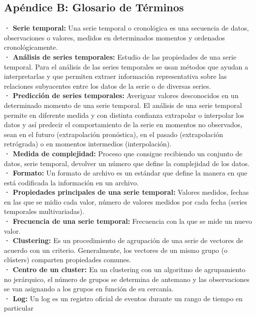\documentclass[14pt]{extarticle}
\theoremstyle{definition}
\theoremstyle{remark}
\begin{document}
\subsection{Apéndice B: Glosario de Términos}\label{sec:glosariodeterminos}
\textbf{· Serie temporal:} Una serie temporal o cronológica es una secuencia de datos, observaciones o valores, medidos en determinados momentos y ordenados cronológicamente.\\
\textbf{· Análisis de series temporales:} Estudio de las propiedades de una serie temporal. Para el análisis de las series temporales se usan métodos que ayudan a interpretarlas y que permiten extraer información representativa sobre las relaciones subyacentes entre los datos de la serie o de diversas series.\\
\textbf{· Predicción de series temporales:} Averiguar valores desconocidos en un determinado momento de una serie temporal. El análisis de una serie temporal permite en diferente medida y con distinta confianza extrapolar o interpolar los datos y así predecir el comportamiento de la serie en momentos no observados, sean en el futuro (extrapolación pronóstica), en el pasado (extrapolación retrógrada) o en momentos intermedios (interpolación).\\
\textbf{· Medida de complejidad:} Proceso que consigue recibiendo un conjunto de datos, serie temporal, devolver un número que define la complejidad de los datos.\\
\textbf{· Formato:} Un formato de archivo es un estándar que define la manera en que está codificada la información en un archivo.\\
\textbf{· Propiedades principales de una serie temporal:} Valores medidos, fechas en las que se midio cada valor, número de valores medidos por cada fecha (series temporales multivariadas).\\
\textbf{· Frecuencia de una serie temporal:} Frecuencia con la que se mide un nuevo valor.\\
\textbf{· Clustering:} Es un procedimiento de agrupación de una serie de vectores de acuerdo con un criterio. Generalmente, los vectores de un mismo grupo (o clústers) comparten propiedades comunes.\\
\textbf{· Centro de un cluster:} En un clustering con un algoritmo de agrupamiento no jerárquico, el número de grupos se determina de antemano y las observaciones se van asignando a los grupos en función de su cercanía.\\
\textbf{· Log:} Un log es un registro oficial de eventos durante un rango de tiempo en particular\\
\end{document}
